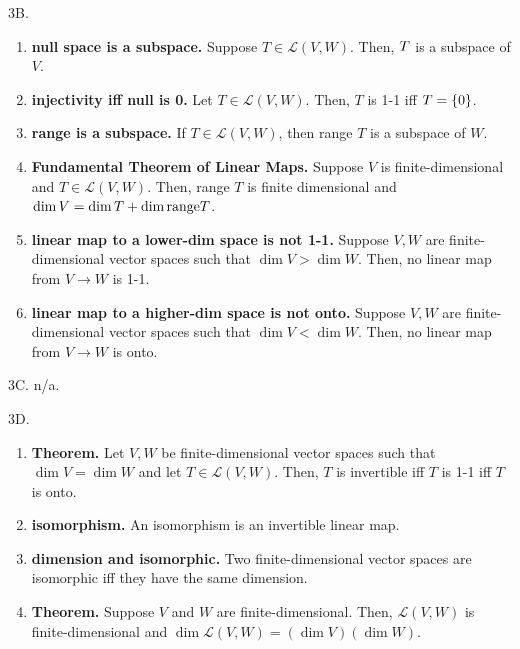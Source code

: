 \documentclass[12pt]{article}
\theoremstyle{definition}
\theoremstyle{named}
\begin{document}
3B. 
\begin{enumerate}
	\item \textbf{null space is a subspace. } Suppose $T \in \mathscr{L}(V,W)$. Then, $\null T$ is a subspace of $V$. 
	\item \textbf{injectivity iff null is 0. } Let $T \in \mathscr{L}(V,W)$. Then, $T$ is 1-1 iff $\null T = \{0\}$. 
	\item \textbf{range is a subspace. } If $T \in \mathscr{L}(V,W)$, then range $T$ is a subspace of $W$. 
	\item \textbf{Fundamental Theorem of Linear Maps. } Suppose $V$ is finite-dimensional and $T \in \mathscr{L}(V,W)$. Then, range $T$ is finite dimensional and $\dim V = \dim \null T + \dim \textrm{range} T$. 
	\item \textbf{linear map to a lower-dim space is not 1-1. } Suppose $V,W$ are finite-dimensional vector spaces such that $\dim V > \dim W$. Then, no linear map from $V \to W$ is 1-1. 
	\item \textbf{linear map to a higher-dim space is not onto. } Suppose $V,W$ are finite-dimensional vector spaces such that $\dim V < \dim W$. Then, no linear map from $V \to W$ is onto. 
\end{enumerate}

3C. n/a. 

3D. 
\begin{enumerate}
	\item \textbf{Theorem. } Let $V,W$ be finite-dimensional vector spaces such that $\dim V = \dim W$ and let $T \in \mathscr{L}(V,W)$. Then, $T$ is invertible iff $T$ is 1-1 iff $T$ is onto. 
	\item \textbf{isomorphism. } An isomorphism is an invertible linear map. 
	\item \textbf{dimension and isomorphic. } Two finite-dimensional vector spaces are isomorphic iff they have the same dimension. 
	\item \textbf{Theorem. } Suppose $V$ and $W$ are finite-dimensional. Then, $\mathscr{L}(V,W)$ is finite-dimensional and $\dim \mathscr{L}(V,W) = (\dim V)(\dim W)$. 
\end{enumerate}
\end{document}
